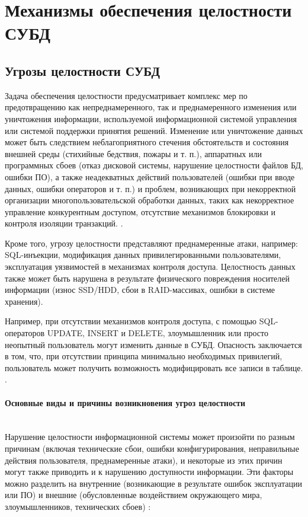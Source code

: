 \section{Механизмы обеспечения целостности СУБД}

\subsection{Угрозы целостности СУБД}

Задача обеспечения целостности предусматривает комплекс мер по предотвращению как непреднамеренного, так и преднамеренного изменения или уничтожения информации, используемой информационной системой управления или системой поддержки принятия решений. Изменение или уничтожение данных может быть следствием неблагоприятного стечения обстоятельств и состояния внешней среды (стихийные бедствия, пожары и т. п.), аппаратных или программных сбоев (отказ дисковой системы, нарушение целостности файлов БД, ошибки ПО), а также неадекватных действий пользователей (ошибки при вводе данных, ошибки операторов и т. п.) и проблем, возникающих при некорректной организации многопользовательской обработки данных, таких как некорректное управление конкурентным доступом, отсутствие механизмов блокировки и контроля изоляции транзакций. \autocite{Lihonosov2011, postgredoc1}.

Кроме того, угрозу целостности представляют преднамеренные атаки, например: SQL-инъекции, модификация данных привилегированными пользователями, эксплуатация уязвимостей в механизмах контроля доступа. Целостность данных также может быть нарушена в результате физического повреждения носителей информации (износ SSD/HDD, сбои в RAID-массивах, ошибки в системе хранения).

Например, при отсутствии механизмов контроля доступа, с помощью SQL-операторов UPDATE, INSERT и DELETE, злоумышленник или просто неопытный пользователь могут изменить данные в СУБД. Опасность заключается в том, что, при отсутствии принципа минимально необходимых привилегий, пользователь может получить возможность модифицировать все записи в таблице.  \autocite{Utebov2008, nist80012}.

\paragraph{Основные виды и причины возникновения угроз целостности} ~\\

Нарушение целостности информационной системы может произойти по разным причинам (включая технические сбои, ошибки конфигурирования, неправильные действия пользователя, преднамеренные атаки), и некоторые из этих причин могут также приводить и к нарушению доступности информации. \autocite{Pirogov2009}
Эти факторы можно разделить на внутренние (возникающие в результате ошибок эксплуатации или ПО) и внешние (обусловленные воздействием окружающего мира, злоумышленников, технических сбоев) \autocites{IntuitThreats, HabrCloudThreats, WikiExploit, KasperskyDailyOAuth}:

